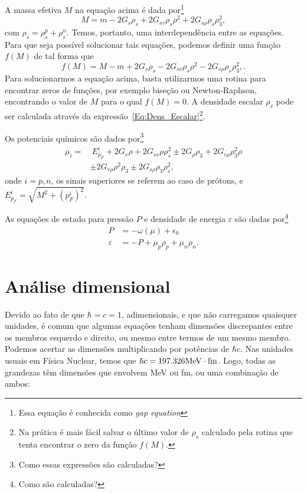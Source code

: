 A massa efetiva $M$ na equação acima é dada por\footnote{Essa equação é conhecida como \emph{gap equation}}
\begin{equation}\label{Eq:Gap}
	M = m - 2G_s\rho_s + 2G_{sv}\rho_s\rho^2 + 2 G_{s\rho}\rho_s\rho_3^2,
\end{equation}
%
com $\rho_s = \rho_s^p + \rho_s^n$. Temos, portanto, uma interdependência entre as equações. Para que seja possível solucionar tais equações, podemos definir uma função $f(M)$ de tal forma que
\begin{equation}\label{Eq:Gap_zero}
	f(M) = M - m + 2G_s\rho_s - 2G_{sv}\rho_s\rho^2 - 2 G_{s\rho}\rho_s\rho_3^2,.
\end{equation}
%
Para solucionarmos a equação acima, basta utilizarmos uma rotina para encontrar zeros de funções, por exemplo biseção ou Newton-Raphson, encontrando o valor de $M$ para o qual $f(M) = 0$. A densidade escalar $\rho_s$ pode ser calculada através da expressão~\eqref{Eq:Dens_Escalar}\footnote{Na prática é mais fácil salvar o último valor de $\rho_s$ calculado pela rotina que tenta encontrar o zero da função $f(M)$.}.

Os potenciais químicos são dados por\footnote{Como essas expressões são calculadas?}
\begin{equation}\label{Eq:Potenciais_Quimicos}
\begin{split}
	\mu_i =&~ E_{p_F}^i + 2G_v\rho + 2G_{sv}\rho\rho_s^2 \pm 2G_\rho\rho_3+2G_{v\rho}\rho_3^2\rho \\
	& \pm 2G_{v\rho}\rho^2\rho_3 \pm 2 G_{s\rho}\rho_3\rho_s^2,
\end{split}
\end{equation}
%
onde $i = p,n$, os sinais superiores se referem ao caso de prótons, e $E_{p_F}^i = \sqrt{M^2 + (p_F^i)^2}$.

As equações de estado para pressão $P$ e densidade de energia $\varepsilon$ são dadas por\footnote{Como são calculadas?}
\begin{align}
	P &= -\omega(\mu) + \epsilon_0 \label{Eq:Pressao}\\
	\varepsilon &= -P + \mu_p\rho_p + \mu_n\rho_n. \label{Eq:Densidade_energia}
\end{align}

\section{Análise dimensional}

Devido ao fato de que $\hbar = c = 1$, adimensionais, e que não carregamos quaisquer unidades, é comum que algumas equações tenham dimensões discrepantes entre os membros esquerdo e direito, ou mesmo entre termos de um mesmo membro. Podemos acertar as dimensões multiplicando por potências de $\hbar c$. Nas unidades usuais em Física Nuclear, temos que $\hbar c = 197.326\rm{MeV}\cdot\rm{fm}$. Logo, todas as grandezas têm dimensões que envolvem MeV ou fm, ou uma combinação de ambos:

